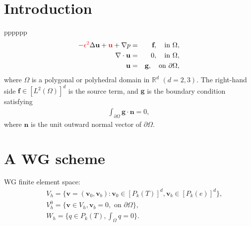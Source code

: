\documentclass[leqno]{siamltex704}
\numberwithin{equation}{section}
\def\bu{{\mathbf{u}}}
\def\bv{{\mathbf{v}}}
\def\bn{{\mathbf{n}}}
\def\bf{{\mathbf{f}}}
\def\bg{{\mathbf{g}}}
\newcommand{\Real}{\mathbb{R}}
\begin{document}

%
%




\section{Introduction}
pppppp
\begin{eqnarray}
\label{problem-eq1}-{\color{red}\epsilon^2}\Delta \textbf{u}+{\color{red}\bu}+\nabla p &=& \textbf{f}, \quad
{\rm in}\ \Omega,\\
\label{problem-eq2}\nabla \cdot\textbf{u}&=&0,\quad {\rm in}\ \Omega,
\\
\label{problem-eq3}\textbf{u}&=&\textbf{g},\quad {\rm on}\ \partial\Omega,
\end{eqnarray}
where $\Omega$ is a polygonal or polyhedral domain in $\Real^d$ $(d=2,3)$.
The right-hand side $\bf\in [L^2(\Omega)]^d$ is the source term, and
$\bg$ is the boundary condition satisfying
\begin{eqnarray*}
\int_{\partial\Omega}\bg\cdot\bn =0,
\end{eqnarray*}
where $\bn$ is the unit outward normal vector of $\partial\Omega$.

\section{A WG scheme}
WG finite element space:
\begin{eqnarray*}
  &&V_h = \{\bv=(\bv_0,\bv_b): \bv_0\in [P_k(T)]^d, \bv_b\in [P_k(e)]^d\},
  \\
  &&V_h^0 = \{\bv\in V_h, \bv_b = 0,\text{ on }\partial\Omega\},
  \\
  &&W_h = \{q\in P_k(T), \int_\Omega q = 0\}.
\end{eqnarray*}
\end{document}
